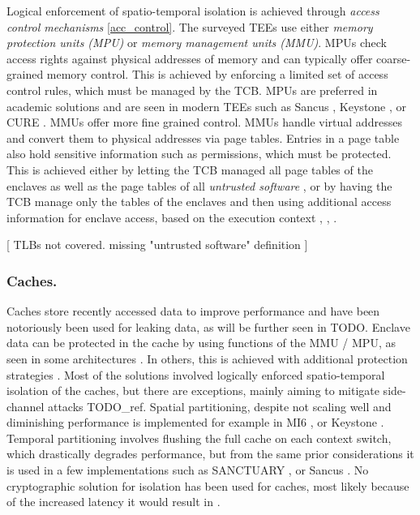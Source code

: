 \documentclass[runningheads,a4paper]{uwsese}
\begin{document}
Logical enforcement of spatio-temporal isolation is achieved through
\emph{access control mechanisms} \ref{acc_control}. The surveyed TEEs use
either \emph{memory protection units (MPU)} or \emph{memory management units
(MMU)}. MPUs check access rights against physical addresses of memory and can
typically offer coarse-grained memory control. This is achieved by enforcing a
limited set of access control rules, which must be managed by the TCB. MPUs are
preferred in academic solutions and are seen in modern TEEs such as Sancus
\cite{tee_sancus}, Keystone \cite{tee_keystone}, or CURE \cite{tee_cure}. MMUs
offer more fine grained control. MMUs handle virtual addresses and convert them
to physical addresses via page tables. Entries in a page table also hold
sensitive information such as permissions, which must be protected. This is
achieved either by letting the TCB managed all page tables of the enclaves as
well as the page tables of all \emph{untrusted software} \cite{tee_ha-vmsi}, or
by having the TCB manage only the tables of the enclaves and then using
additional access information for enclave access, based on the execution
context \cite{intel_tdx}, \cite{arm_tz}, \cite{arm_realms} \cite{tee_hw_sup}.


[ TLBs not covered. missing "untrusted software" definition ]

\subsubsection{Caches.}

Caches store recently accessed data to improve performance and have been
notoriously been used for leaking data, as will be further seen in TODO.
Enclave data can be protected in the cache by using functions of the MMU / MPU,
as seen in some architectures \cite{intel_sgx}. In others, this is achieved
with additional protection strategies \cite{arm_tz}. Most of the solutions
involved logically enforced spatio-temporal isolation of the caches, but there
are exceptions, mainly aiming to mitigate side-channel attacks TODO\_ref.
Spatial partitioning, despite not scaling well and diminishing performance is
implemented for example in MI6 \cite{tee_mi6}, or Keystone \cite{tee_keystone}.
Temporal partitioning involves flushing the full cache on each context switch,
which drastically degrades performance, but from the same prior considerations
it is used in a few implementations such as SANCTUARY \cite{tee_sanctuary}, or
Sancus \cite{tee_sancus}. No cryptographic solution for isolation has been used
for caches, most likely because of the increased latency it would result in
\cite{tee_hw_sup}.
\end{document}
